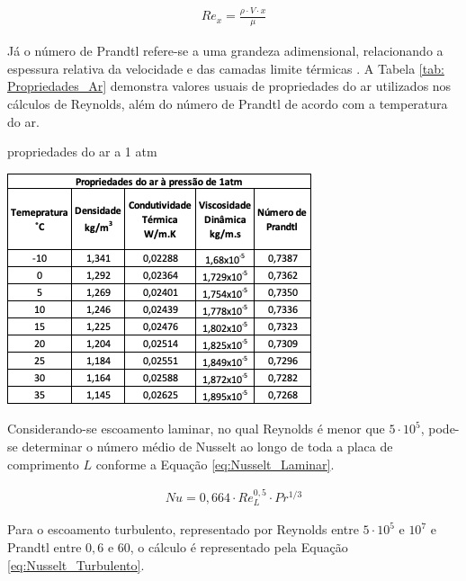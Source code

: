 \documentclass[acronym,symbols,table]{fei}
\begin{document}
\begin{equation} \label{eq:Reynolds}
\begin{aligned}
    {Re}_{x}=\frac{\rho \cdot V \cdot x}{\mu}
\end{aligned}
\end{equation}

Já o número de Prandtl refere-se a uma grandeza adimensional, relacionando a espessura relativa da velocidade e das camadas limite térmicas \cite{cengel1998heat}. A Tabela \ref{tab: Propriedades_Ar} demonstra valores usuais de propriedades do ar utilizados nos cálculos de Reynolds, além do número de Prandtl de acordo com a temperatura do ar.

\begin{table}[!htb] 
 \centering
    \caption{propriedades do ar a 1 atm}
    \includegraphics[width=0.7\linewidth]{Tabelas/Propriedades_ar_1atm.png}
    \label{tab: Propriedades_Ar}
\end{table}

\newpage

Considerando-se escoamento laminar, no qual Reynolds é menor que $5 \cdot 10^5$, pode-se determinar o número médio de Nusselt ao longo de toda a placa de comprimento $L$ conforme a Equação \ref{eq:Nusselt_Laminar}.

\begin{equation} \label{eq:Nusselt_Laminar}
\begin{aligned}
    Nu=0,664 \cdot Re_{L}^{0,5} \cdot Pr^{1/3}
\end{aligned}
\end{equation}

Para o escoamento turbulento, representado por Reynolds entre $5 \cdot 10^5$ e $10^7$ e Prandtl entre $0,6$ e $60$, o cálculo é representado pela Equação \ref{eq:Nusselt_Turbulento}.
\end{document}

